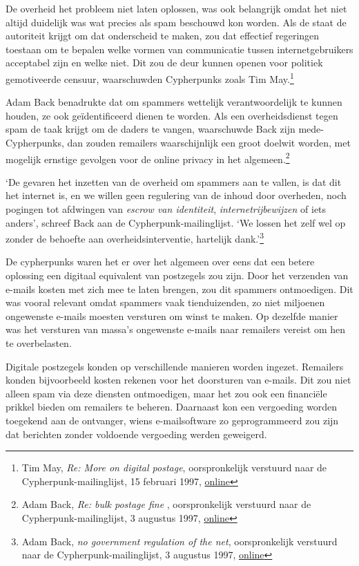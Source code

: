 \documentclass[
  a5paper,
  smalldemyvopaper,11pt,twoside,onecolumn,openright,extrafontsizes,
hidelinks]{memoir}
\begin{document}
De overheid het probleem niet laten oplossen, was ook belangrijk omdat
het niet altijd duidelijk was wat precies als spam beschouwd kon worden.
Als de staat de autoriteit krijgt om dat onderscheid te maken, zou dat
effectief regeringen toestaan om te bepalen welke vormen van
communicatie tussen internetgebruikers acceptabel zijn en welke niet.
Dit zou de deur kunnen openen voor politiek gemotiveerde censuur,
waarschuwden Cypherpunks zoals Tim May.\footnote{Tim May, \emph{Re: More
  on digital postage}, oorspronkelijk verstuurd naar de
  Cypherpunk-mailinglijst, 15 februari 1997,
  \href{https://cypherpunks.venona.com/date/1997/02/msg02295.h}{online}}

Adam Back benadrukte dat om spammers wettelijk verantwoordelijk te
kunnen houden, ze ook geïdentificeerd dienen te worden. Als een
overheidsdienst tegen spam de taak krijgt om de daders te vangen,
waarschuwde Back zijn mede-Cypherpunks, dan zouden remailers
waarschijnlijk een groot doelwit worden, met mogelijk ernstige gevolgen
voor de online privacy in het algemeen.\footnote{Adam Back, \emph{Re:
  bulk postage fine }, oorspronkelijk verstuurd naar de
  Cypherpunk-mailinglijst, 3 augustus 1997,
  \href{https://cypherpunks.venona.com/date/1997/08/msg00070.html}{online}}

`De gevaren het inzetten van de overheid om spammers aan te vallen, is
dat dit het internet is, en we willen geen regulering van de inhoud door
overheden, noch pogingen tot afdwingen van \emph{escrow van identiteit},
\emph{internetrijbewijzen} of iets anders', schreef Back aan de
Cypherpunk-mailinglijst. `We lossen het zelf wel op zonder de behoefte
aan overheidsinterventie, hartelijk dank.'\footnote{Adam Back, \emph{no
  government regulation of the net}, oorspronkelijk verstuurd naar de
  Cypherpunk-mailinglijst, 3 augustus 1997,
  \href{https://cypherpunks.venona.com/date/1997/08/msg00087.html}{online}}

De cypherpunks waren het er over het algemeen over eens dat een betere
oplossing een digitaal equivalent van postzegels zou zijn. Door het
verzenden van e-mails kosten met zich mee te laten brengen, zou dit
spammers ontmoedigen. Dit was vooral relevant omdat spammers vaak
tienduizenden, zo niet miljoenen ongewenste e-mails moesten versturen om
winst te maken. Op dezelfde manier was het versturen van massa's
ongewenste e-mails naar remailers vereist om hen te overbelasten.

Digitale postzegels konden op verschillende manieren worden ingezet.
Remailers konden bijvoorbeeld kosten rekenen voor het doorsturen van
e-mails. Dit zou niet alleen spam via deze diensten ontmoedigen, maar
het zou ook een financiële prikkel bieden om remailers te beheren.
Daarnaast kon een vergoeding worden toegekend aan de ontvanger, wiens
e-mailsoftware zo geprogrammeerd zou zijn dat berichten zonder voldoende
vergoeding werden geweigerd.
\end{document}
